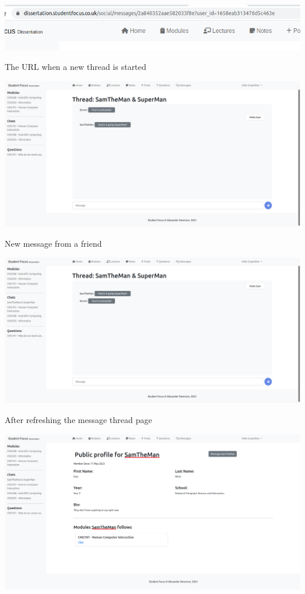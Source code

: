 \includegraphics[scale=0.40]{images/application/65 - url_new_message_thread.png}

The URL when a new thread is started

\includegraphics[scale=0.20]{images/application/25 - message_from Sam.png}

New message from a friend

\includegraphics[scale=0.20]{images/application/26 - message_thread_on_refresh.png}

After refreshing the message thread page

\includegraphics[scale=0.20]{images/application/27 - sams_profile.png}

